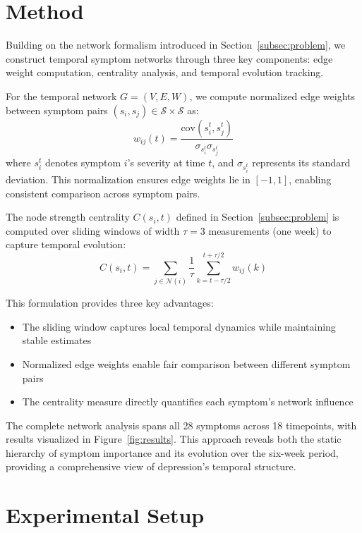 \documentclass{article} %
\begin{document}
\section{Method}
\label{sec:method}

Building on the network formalism introduced in Section~\ref{subsec:problem}, we construct temporal symptom networks through three key components: edge weight computation, centrality analysis, and temporal evolution tracking.

For the temporal network $G = (V, E, W)$, we compute normalized edge weights between symptom pairs $(s_i, s_j) \in \mathcal{S} \times \mathcal{S}$ as:
\begin{equation}
    w_{ij}(t) = \frac{\text{cov}(s_i^t, s_j^t)}{\sigma_{s_i^t}\sigma_{s_j^t}}
\end{equation}
where $s_i^t$ denotes symptom $i$'s severity at time $t$, and $\sigma_{s_i^t}$ represents its standard deviation. This normalization ensures edge weights lie in $[-1,1]$, enabling consistent comparison across symptom pairs.

The node strength centrality $C(s_i, t)$ defined in Section~\ref{subsec:problem} is computed over sliding windows of width $\tau = 3$ measurements (one week) to capture temporal evolution:
\begin{equation}
    C(s_i, t) = \sum_{j \in \mathcal{N}(i)} \frac{1}{\tau} \sum_{k=t-\tau/2}^{t+\tau/2} w_{ij}(k)
\end{equation}

This formulation provides three key advantages:
\begin{itemize}
    \item The sliding window captures local temporal dynamics while maintaining stable estimates
    \item Normalized edge weights enable fair comparison between different symptom pairs
    \item The centrality measure directly quantifies each symptom's network influence
\end{itemize}

The complete network analysis spans all 28 symptoms across 18 timepoints, with results visualized in Figure~\ref{fig:results}. This approach reveals both the static hierarchy of symptom importance and its evolution over the six-week period, providing a comprehensive view of depression's temporal structure.

\section{Experimental Setup}
\label{sec:experimental}
\end{document}
